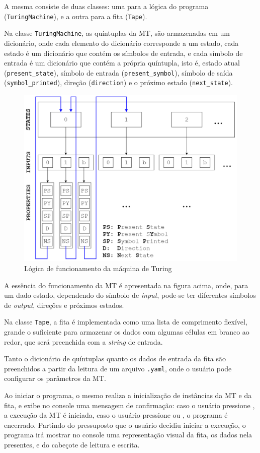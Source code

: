 \documentclass[12pt,fleqn]{article}
\begin{document}
A mesma consiste de duas classes: uma para a lógica do programa
(\verb|TuringMachine|), e a outra para a fita (\verb|Tape|).

Na classe \verb|TuringMachine|, as quíntuplas da MT, são armazenadas em um
dicionário, onde cada elemento do dicionário corresponde a um estado, cada
estado é um dicionário que contém os símbolos de entrada, e cada símbolo de
entrada é um dicionário que contém a própria quíntupla, isto é, estado atual
(\verb|present_state|), símbolo de entrada (\verb|present_symbol|), símbolo de
saída (\verb|symbol_printed|), direção (\verb|direction|) e o próximo estado
(\verb|next_state|).

\begin{figure}[H]
    \centering
    \includegraphics[width=0.8\linewidth]{img/tm_logic}
    \caption{Lógica de funcionamento da máquina de Turing}
\end{figure}

A essência do funcionamento da MT é apresentada na figura acima, onde, para um
dado estado, dependendo do símbolo de \textit{input}, pode-se ter diferentes
símbolos de \textit{output}, direções e próximos estados.

Na classe \verb|Tape|, a fita é implementada como uma lista de comprimento
flexível, grande o suficiente para armazenar os dados com algumas células em
branco ao redor, que será preenchida com a \textit{string} de entrada.

Tanto o dicionário de quíntuplas quanto os dados de entrada da fita são
preenchidos a partir da leitura de um arquivo \verb|.yaml|, onde o usuário pode
configurar os parâmetros da MT.

Ao iniciar o programa, o mesmo realiza a inicialização de instâncias da MT e da
fita, e exibe no console uma mensagem de confirmação: caso o usuário pressione
\keys{\return}, a execução da MT é iniciada, caso o usuário pressione
 ou , o programa é encerrado. Partindo do
pressuposto que o usuário decidiu iniciar a execução, o programa irá mostrar no
console uma representação visual da fita, os dados nela presentes, e do cabeçote
de leitura e escrita.
\end{document}
